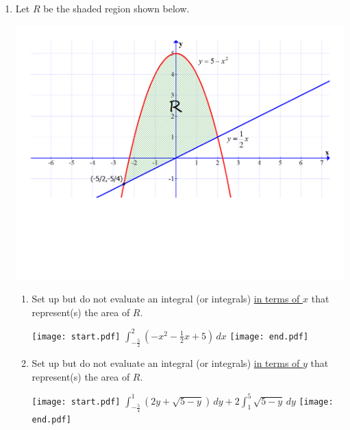 \documentclass[12pt]{article}
\begin{document}
\begin{enumerate}

\item Let $R$ be the shaded region shown below.

\begin{center}

\includegraphics[scale=0.5]{graph3.pdf}

\end{center}

\begin{enumerate} 

\item Set up but do not evaluate an integral (or integrals) \underline{in terms of $x$} that represent(s) the area of $R$. 

\texttt{[image: start.pdf]}
{{$\int_{-\frac{5}{2}}^2 \left(-x^2-\frac{1}{2}x+5\right) \,dx$}}
\texttt{[image: end.pdf]}


\item Set up but do not evaluate an integral (or integrals) \underline{in terms of $y$} that represent(s) the area of $R$. 

\texttt{[image: start.pdf]}
{{$\int_{-\frac{5}{4}}^1 \left(2y+\sqrt{5-y}\right) \,dy+2\int_1^5 \sqrt{5-y} \,dy$}}
\texttt{[image: end.pdf]}


\end{enumerate}

\end{enumerate}

\newpage

\end{document}

